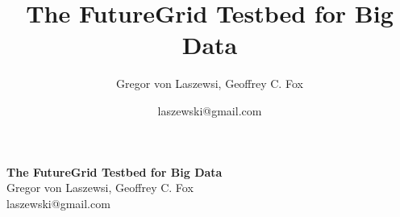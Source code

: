 \documentclass{article}
\makeatletter
\newcommand{\TITLE}{The FutureGrid Testbed for Big Data}
\newcommand{\AUTHOR}{Gregor von Laszewsi, Geoffrey C. Fox}
\newcommand{\EMAIL}{laszewski@gmail.com}
\makeatother
\begin{document}
\title{\TITLE}
\author{\AUTHOR}
\date{\EMAIL}




\begin{center}
{\Large\bf \TITLE}\\
{\AUTHOR}\\
{\EMAIL}
\end{center}

\tableofcontents

\newpage


\listoftodos

\newpage



\maketitle

\end{document}
